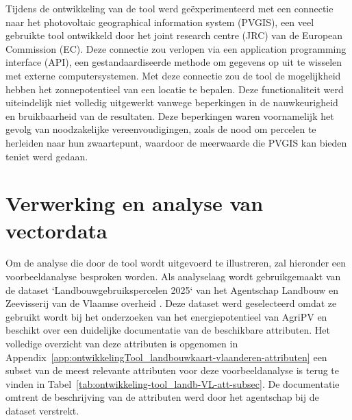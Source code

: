 Tijdens de ontwikkeling van de tool werd geëxperimenteerd met een connectie naar het photovoltaic geographical information system (PVGIS), een veel gebruikte tool ontwikkeld door het joint research centre (JRC) van de European Commission (EC). Deze connectie zou verlopen via een application programming interface (API), een gestandaardiseerde methode om gegevens op uit te wisselen met externe computersystemen. Met deze connectie zou de tool de mogelijkheid hebben het zonnepotentieel van een locatie te bepalen. 
Deze functionaliteit werd uiteindelijk niet volledig uitgewerkt vanwege beperkingen in de nauwkeurigheid en bruikbaarheid van de resultaten. Deze beperkingen waren voornamelijk het gevolg van noodzakelijke vereenvoudigingen, zoals de nood om percelen te herleiden naar hun zwaartepunt, waardoor de meerwaarde die PVGIS kan bieden teniet werd gedaan.

\section{Verwerking en analyse van vectordata}\label{sec:dataVerwerking}

Om de analyse die door de tool wordt uitgevoerd te illustreren, zal hieronder een voorbeeldanalyse besproken worden.
Als analyselaag wordt gebruikgemaakt van de dataset `Landbouwgebruikspercelen 2025` van het Agentschap Landbouw en Zeevisserij van de Vlaamse overheid \autocite{vlaanderen_landbouwpercelen_2025}.
Deze dataset werd geselecteerd omdat ze gebruikt wordt bij het onderzoeken van het energiepotentieel van AgriPV en beschikt over een duidelijke documentatie van de beschikbare attributen.
Het volledige overzicht van deze attributen is opgenomen in Appendix~\ref{app:ontwikkelingTool_landbouwkaart-vlaanderen-attributen} een subset van de meest relevante attributen voor deze voorbeeldanalyse is terug te vinden in Tabel~\ref{tab:ontwikkeling-tool_landb-VL-att-subsec}.
De documentatie omtrent de beschrijving van de attributen werd door het agentschap bij de dataset verstrekt.
\medskip          

